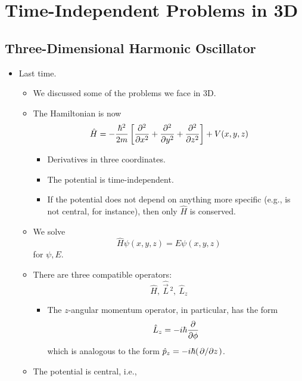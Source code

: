 \documentclass[../notes.tex]{subfiles}
\begin{document}
\chapter{Time-Independent Problems in 3D}
\section{Three-Dimensional Harmonic Oscillator}
\begin{itemize}
    \item {}Last time.
    \begin{itemize}
        \item We discussed some of the problems we face in 3D.
        \item The Hamiltonian is now
        \begin{equation*}
            \hat{H} = -\frac{\hbar^2}{2m}\left[ \pdv[2]{x}+\pdv[2]{y}+\pdv[2]{z} \right]+V(x,y,z)
        \end{equation*}
        \begin{itemize}
            \item Derivatives in three coordinates.
            \item The potential is time-independent.
            \item If the potential does not depend on anything more specific (e.g., is not central, for instance), then only $\hat{H}$ is conserved.
        \end{itemize}
        \item We solve
        \begin{equation*}
            \hat{H}\psi(x,y,z) = E\psi(x,y,z)
        \end{equation*}
        for $\psi,E$.
        \item There are three compatible operators:
        \begin{equation*}
            \hat{H},\ \hat{\vec{L}}{\,}^2,\ \hat{L}_z
        \end{equation*}
        \begin{itemize}
            \item The $z$-angular momentum operator, in particular, has the form
            \begin{equation*}
                \hat{L}_z = -i\hbar\pdv{\phi}
            \end{equation*}
            which is analogous to the form $\hat{p}_z=-i\hbar(\pdv*{z})$.
        \end{itemize}
        \item The potential is central, i.e.,

\end{itemize}
\end{itemize}
\end{document}
